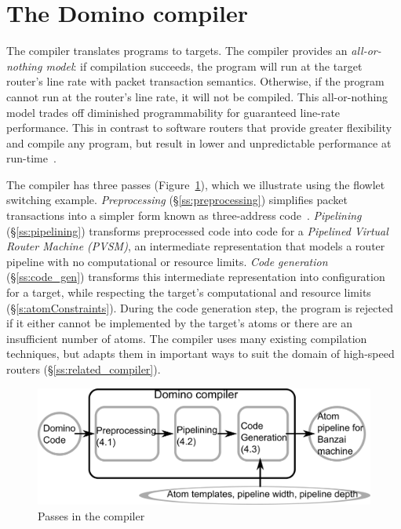\section{The Domino compiler}
\label{s:compiler}

The \pktlanguage compiler translates \pktlanguage programs to \absmachine
targets. The compiler provides an {\em all-or-nothing model}: if compilation
succeeds, the program will run at the target router's line rate with packet
transaction semantics. Otherwise, if the program cannot run at the router's
line rate, it will not be compiled. This all-or-nothing model trades off
diminished programmability for guaranteed line-rate performance. This in
contrast to software routers that provide greater flexibility and compile any
program, but result in lower and unpredictable performance at
run-time~\cite{dobrescu2012}.

The \pktlanguage compiler has three passes (Figure~\ref{fig:passes}), which we
illustrate using the flowlet switching example.  \textit{Preprocessing}
(\S\ref{ss:preprocessing}) simplifies packet transactions into a simpler form
known as three-address code~\cite{tac}.  \textit{Pipelining}
(\S\ref{ss:pipelining}) transforms preprocessed code into code for a
\textit{Pipelined Virtual Router Machine (PVSM)}, an intermediate
representation that models a router pipeline with no computational or resource
limits. \textit{Code generation} (\S\ref{ss:code_gen}) transforms this
intermediate representation into configuration for a \absmachine target, while
respecting the target's computational and resource limits
(\S\ref{s:atomConstraints}). During the code generation step, the program is
rejected if it either cannot be implemented by the target's atoms or there are
an insufficient number of atoms.  The \pktlanguage compiler uses many existing
compilation techniques, but adapts them in important ways to suit the domain of
high-speed routers (\S\ref{ss:related_compiler}).

\begin{figure}[!t]
  \centering
  \includegraphics[width=0.75\columnwidth]{domino_compiler.pdf}
  \caption{Passes in the \pktlanguage compiler}
  \label{fig:passes}
\end{figure}

